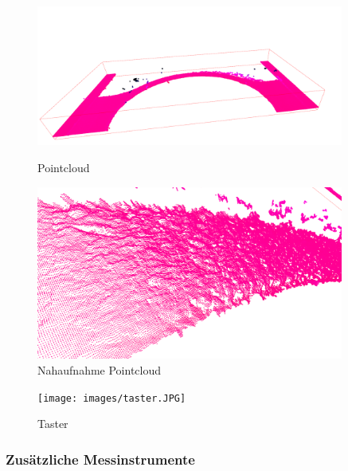 \documentclass[../main.tex]{subfiles}
\begin{document}
\begin{figure}[h]
    \centering
    \begin{minipage}{0.45\textwidth}
        \centering
        \includegraphics[width=0.9\textwidth]{images/pointcloud_big.PNG} %
        \caption{Pointcloud}
        \label{fig:pointcloud_big}
    \end{minipage}\hfill
    \begin{minipage}{0.45\textwidth}
        \centering
        \includegraphics[width=0.9\textwidth]{images/pointcloud_small.PNG} %
        \caption{Nahaufnahme Pointcloud}
        \label{fig:pointcloud_small}
    \end{minipage}
\end{figure}

\begin{figure}
    \texttt{[image: images/taster.JPG]}
    \caption{Taster}
    \label{fig:taster}
\end{figure}

\subsubsection{Zusätzliche Messinstrumente}
\end{document}
